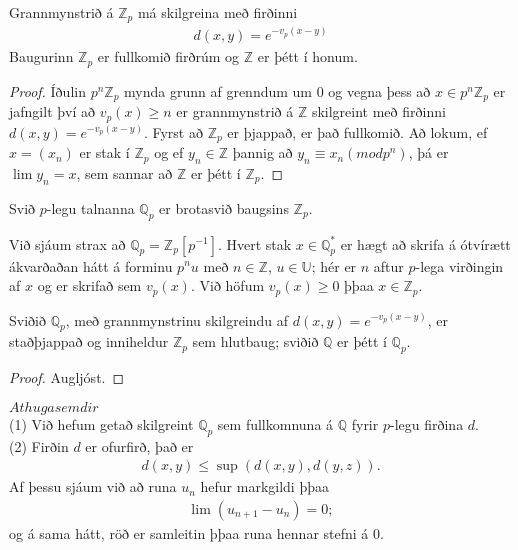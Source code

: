 \begin{setn}
 Grannmynstrið á $\mathbb{Z}_p$ má skilgreina með firðinni
\begin{align}
 d(x,y) = e^{-v_p(x-y)}
\end{align}
Baugurinn $\mathbb{Z}_p$ er fullkomið firðrúm og $\mathbb{Z}$  er þétt 
í honum.
\end{setn}
\begin{proof}
 Íðulin $p^n \mathbb{Z}_p$ mynda grunn af grenndum um 0 og vegna þess að 
$x \in p^n \mathbb{Z}_p$ er jafngilt því að $v_p(x) \geq n$ er grannmynstrið 
á $\mathbb{Z}$ skilgreint með firðinni $d(x,y) = e^{-v_p(x-y)}$. 
Fyrst að $\mathbb{Z}_p$ er þjappað, er það fullkomið. Að lokum, ef $x = (x_n)$
 er stak í $\mathbb{Z}_p$ og ef $y_n \in \mathbb{Z}$ þannig að 
$y_n \equiv x_n(mod p^n)$, þá er $\lim y_n = x$, sem sannar að $\mathbb{Z}$ 
er þétt í $\mathbb{Z}_p$.
\end{proof}

\begin{skilgr}
 Svið $p$-legu talnanna $\mathbb{Q}_p$ er brotasvið baugsins $\mathbb{Z}_p$.
\end{skilgr}
Við sjáum strax að $\mathbb{Q}_p = \mathbb{Z}_p[p^{-1}]$. Hvert stak 
$x \in \mathbb{Q}_p^*$ er hægt að skrifa á ótvírætt ákvarðaðan hátt á forminu 
$p^nu$ með $n \in \mathbb{Z}$, $u \in \mathbb{U}$; hér er $n$ aftur $p$-lega 
virðingin af $x$ og er skrifað sem $v_p(x)$. Við höfum $v_p(x) \geq 0$ þþaa 
$x \in \mathbb{Z}_p$. 
\begin{setn}
 Sviðið $\mathbb{Q}_p$, með grannmynstrinu skilgreindu af 
$d(x,y) = e^{-v_p(x-y)}$, er staðþjappað og inniheldur $\mathbb{Z}_p$ sem 
hlutbaug; sviðið $\mathbb{Q}$ er þétt í $\mathbb{Q}_p$.
\end{setn}
\begin{proof}
 Augljóst.
\end{proof}
$Athugasemdir$\\
(1) Við hefum getað skilgreint $\mathbb{Q}_p$ sem fullkomnuna á $\mathbb{Q}$ 
fyrir $p$-legu firðina $d$.\\
(2) Firðin $d$ er ofurfirð, það er 
\begin{align*}
 d(x,y) \leq \sup (d(x,y),d(y,z)).
\end{align*}
Af þessu sjáum við að runa $u_n$ hefur markgildi þþaa 
\begin{align*}
 \lim(u_{n+1} - u_n) = 0;
\end{align*}
og á sama hátt, röð er samleitin þþaa runa hennar stefni á 0.


